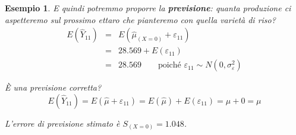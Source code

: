 \documentclass[
  11pt,
]{book}
\theoremstyle{mytheoremstyle}
\theoremstyle{mydefstyle}
\newtheorem{example}{{Esempio}}[section]
\begin{document}
\begin{example}
E quindi potremmo proporre la \textbf{previsione}:
quanta produzione ci aspetteremo sul prossimo ettaro che pianteremo con quella varietà di riso?
\begin{eqnarray*}
E(\hat Y_{11})&=&E(\hat\mu_{(X=0)}+\varepsilon_{11})\\
&=&28.569+E(\varepsilon_{11})\\ 
&=&28.569\qquad \text{poiché } 
\varepsilon_{11}\sim N\left(0,\sigma_\varepsilon^2\right)
\end{eqnarray*}

È una \emph{previsione} corretta?
\[E(\hat Y_{11})=E(\hat\mu+\varepsilon_{11})=E(\hat\mu)+E(\varepsilon_{11})=\mu+0=\mu\]

L'errore di previsione stimato è \(S_{(X=0)}=1.048\).
\end{example}
\end{document}
